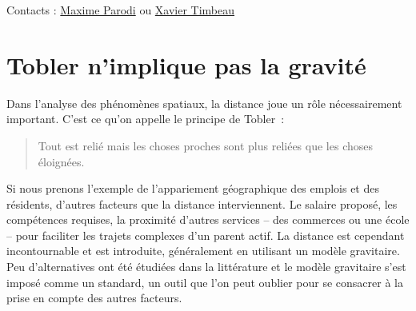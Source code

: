 \documentclass[
  10pt,
  a4paper,
  numbers=noendperiod,
  DIV=9]{scrreprt}
\begin{document}
Contacts : \href{mailto:maxime.parodi@sciencespo.fr}{Maxime Parodi} ou
\href{xavier.timbeau@sciencespo.fr}{Xavier Timbeau}


\hypertarget{tobler-nimplique-pas-la-gravituxe9}{%
\chapter{Tobler n'implique pas la
gravité}\label{tobler-nimplique-pas-la-gravituxe9}}

Dans l'analyse des phénomènes spatiaux, la distance joue un rôle
nécessairement important. C'est ce qu'on appelle le principe de Tobler~:

\begin{quote}
Tout est relié mais les choses proches sont plus reliées que les choses
éloignées.
\end{quote}

Si nous prenons l'exemple de l'appariement géographique des emplois et
des résidents, d'autres facteurs que la distance interviennent. Le
salaire proposé, les compétences requises, la proximité d'autres
services -- des commerces ou une école -- pour faciliter les trajets
complexes d'un parent actif. La distance est cependant incontournable et
est introduite, généralement en utilisant un modèle gravitaire. Peu
d'alternatives ont été étudiées dans la littérature et le modèle
gravitaire s'est imposé comme un standard, un outil que l'on peut
oublier pour se consacrer à la prise en compte des autres facteurs.
\end{document}
